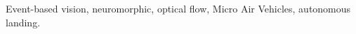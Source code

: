 \documentclass[journal,onecolumn,12pt]{IEEEtran}
\begin{document}


\begin{IEEEkeywords}
Event-based vision, neuromorphic, optical flow, Micro Air Vehicles, autonomous landing.
\end{IEEEkeywords}


%
\IEEEpeerreviewmaketitle










%


\appendices
\end{document}
